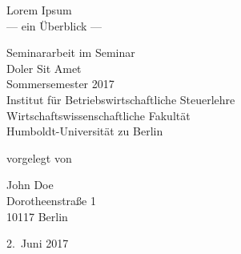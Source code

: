 




\begin{titlepage}
  \begin{center}

  \mbox{}
  \vspace{-1mm}

  {\huge Lorem Ipsum \\[1em] {\LARGE — ein Überblick —}}

  \vspace{1.5cm}


  \vspace{1mm}

  \hfill

  Seminararbeit im Seminar \\
  {\large \sc Doler Sit Amet} \\
  Sommersemester 2017 \\
  Institut für Betriebswirtschaftliche Steuerlehre \\
  Wirtschaftswissenschaftliche Fakultät \\
  Humboldt-Universität zu Berlin

  \vspace{1.5cm}

  vorgelegt von

  \vspace{1em}

  {\Large John Doe} \\
  Dorotheenstraße 1 \\
  10117 Berlin \\

  \vspace{2em}

  2.~Juni 2017
  \end{center}
\end{titlepage}
\newpage
{}
\tableofcontents

